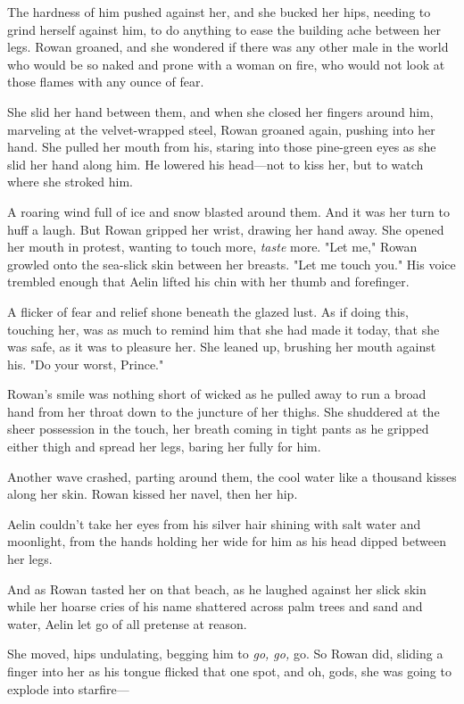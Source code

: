 The hardness of him pushed against her, and she bucked her hips, needing to grind herself against him, to do anything to ease the building ache between her legs. Rowan groaned, and she wondered if there was any other male in the world who would be so naked and prone with a woman on fire, who would not look at those flames with any ounce of fear.

She slid her hand between them, and when she closed her fingers around him, marveling at the velvet-wrapped steel, Rowan groaned again, pushing into her hand. She pulled her mouth from his, staring into those pine-green eyes as she slid her hand along him. He lowered his head---not to kiss her, but to watch where she stroked him.

A roaring wind full of ice and snow blasted around them. And it was her turn to huff a laugh. But Rowan gripped her wrist, drawing her hand away. She opened her mouth in protest, wanting to touch more,
\emph{taste} more. "Let me," Rowan growled onto the sea-slick skin between her breasts. "Let me touch you." His voice trembled enough that Aelin lifted his chin with her thumb and forefinger.

A flicker of fear and relief shone beneath the glazed lust. As if doing this, touching her, was as much to remind him that she had made it today, that she was safe, as it was to pleasure her. She leaned up, brushing her mouth against his. "Do your worst, Prince."

Rowan's smile was nothing short of wicked as he pulled away to run a broad hand from her throat down to the juncture of her thighs. She shuddered at the sheer possession in the touch, her breath coming in tight pants as he gripped either thigh and spread her legs, baring her fully for him.

Another wave crashed, parting around them, the cool water like a thousand kisses along her skin. Rowan kissed her navel, then her hip.

Aelin couldn't take her eyes from his silver hair shining with salt water and moonlight, from the hands holding her wide for him as his head dipped between her legs.

And as Rowan tasted her on that beach, as he laughed against her slick skin while her hoarse cries of his name shattered across palm trees and sand and water, Aelin let go of all pretense at reason.

She moved, hips undulating, begging him to \emph{go, go,} go. So Rowan did, sliding a finger into her as his tongue flicked that one spot, and oh, gods, she was going to explode into starfire---

